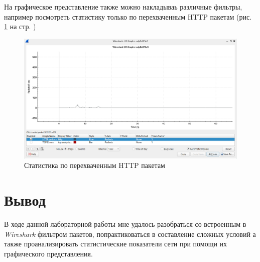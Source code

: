 \documentclass[a4paper]{article}
\begin{document}
  На графическое представление также можно накладываь различные фильтры, например посмотреть 
  статистику только по перехваченным HTTP пакетам (рис. \ref{img:0013} на стр. \pageref{img:0013})

  \begin{figure}[H]
    \centering
    \includegraphics[width=1.0\textwidth]{02_0013}
    \caption{Статистика по перехваченным HTTP пакетам}
    \label{img:0013}
  \end{figure}

  \section{Вывод}

  В ходе данной лабораторной работы мне удалось разобраться со встроенным в 
  \textit{Wireshark} фильтром пакетов, попрактиковаться в составление сложных 
  условий а также проанализировать статистические показатели сети при помощи их 
  графического представления.
\end{document}
